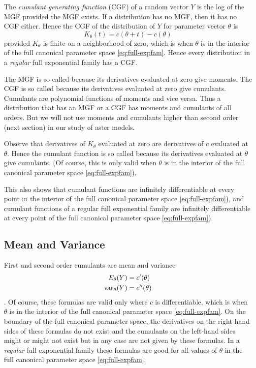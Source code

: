 The \emph{cumulant generating function} (CGF) of a random vector $Y$ is
the log of the MGF provided the MGF exists.
If a distribution has no MGF, then it has no CGF either.
Hence the CGF of the distribution of $Y$ for parameter vector $\theta$ is
$$
   K_\theta(t)
   =
   c(\theta + t) - c(\theta)
$$
provided $K_\theta$ is finite on a neighborhood of zero,
which is when $\theta$ is in the interior of the full canonical
parameter space \eqref{eq:full-expfam}.
Hence every distribution in a \emph{regular} full exponential
family has a CGF.

The MGF is so called because its derivatives evaluated at zero give moments.
The CGF is so called because its derivatives evaluated at zero give cumulants.
Cumulants are polynomial functions of moments and vice versa.
Thus a distribution that has an MGF or a CGF has moments and cumulants of
all orders.
But we will not use moments and cumulants higher than second order
(next section) in our study of aster models.

Observe that derivatives of $K_\theta$ evaluated at zero are derivatives
of $c$ evaluated at $\theta$.  Hence the cumulant function is so called
because its derivatives evaluated at $\theta$ give cumulants.
(Of course, this is only valid when $\theta$ is in the interior of the
full canonical parameter space \eqref{eq:full-expfam}).

This also shows that cumulant functions are infinitely differentiable
at every point in the interior of the full canonical
parameter space \eqref{eq:full-expfam}), and
cumulant functions of a regular full exponential family
are infinitely differentiable
at every point of the full canonical
parameter space \eqref{eq:full-expfam}).

\subsection{Mean and Variance}
\label{sec:mean-variance-cumulant}

First and second order cumulants are mean and variance
\begin{subequations}
\begin{align}
   E_\theta(Y) & = c'(\theta)
   \label{eq:cumulant-one}
   \\
   \operatorname{var}_\theta(Y) & = c''(\theta)
   \label{eq:cumulant-two}
\end{align}
\end{subequations}
\citep[Theorem~8.1]{barndorff-nielsen}.
Of course, these formulas are valid only where $c$ is differentiable,
which is when $\theta$ is in the interior of the full canonical
parameter space \eqref{eq:full-expfam}.
On the boundary of the full canonical parameter space, the derivatives
on the right-hand sides of these formulas do not exist and the cumulants
on the left-hand sides might or might not exist but in any case are not
given by these formulas.
In a \emph{regular} full exponential family these formulas are good
for all values of $\theta$ in the full canonical
parameter space \eqref{eq:full-expfam}.

